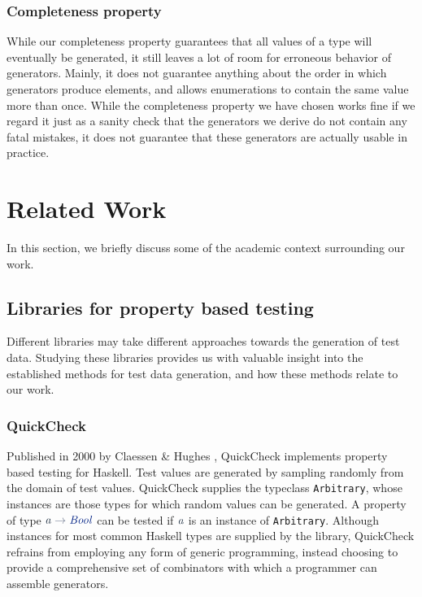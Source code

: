 \documentclass[a4paper,msc,twosized=semi]{uustthesis}
\newcommand*{\mathcolor}{}
\def\mathcolor#1#{\mathcoloraux{#1}}
\newcommand*{\mathcoloraux}[3]{%
  \protect\leavevmode
  \begingroup
    \color#1{#2}#3%
  \endgroup
}
\newcommand{\HSSym}[1]{\mathcolor{hsblue4}{#1}}
\newcommand{\HSCon}[1]{\mathcolor{hsblue3}{\mathit{#1}}}
\newcommand{\HSVar}[1]{\mathcolor{hsblue5}{\mathit{#1}}}
\begin{document}
\subsubsection{Completeness property}

  While our completeness property guarantees that all values of a type will eventually 
  be generated, it still leaves a lot of room for erroneous behavior of generators. Mainly, 
  it does not guarantee anything about the order in which generators produce elements, 
  and allows enumerations to contain the same value more than once. While the completeness 
  property we have chosen works fine if we regard it just as 
  a sanity check that the generators we derive do not contain any fatal mistakes, it 
  does not guarantee that these generators are actually usable in practice. 

\section{Related Work}

  In this section, we briefly discuss some of the academic context surrounding our work. 

\subsection{Libraries for property based testing}

  Different libraries may take different approaches towards the generation of 
  test data. Studying these libraries provides us with valuable insight into the 
  established methods for test data generation, and how these methods relate to 
  our work. 

\subsubsection{QuickCheck}

  Published in 2000 by Claessen \& Hughes \cite{claessen2011quickcheck}, QuickCheck 
  implements property based testing for Haskell. Test values are generated by sampling 
  randomly from the domain of test values. QuickCheck supplies the typeclass \texttt
  {Arbitrary}, whose instances are those types for which random values can be 
  generated. A property of type \ensuremath{\HSVar{a}\HSSym{\to} \HSCon{Bool}} can be tested if \ensuremath{\HSVar{a}} is an instance of 
  \texttt{Arbitrary}. Although instances for most common Haskell types are supplied by the 
  library, QuickCheck refrains from employing any form of generic programming, instead 
  choosing to provide a comprehensive set of combinators with which a programmer can 
  assemble generators. 
\end{document}
